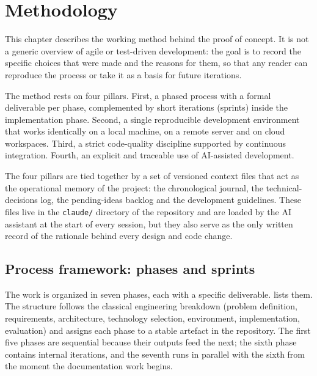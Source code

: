 
\chapter{Methodology}
\label{ch:metodologia}

This chapter describes the working method behind the proof of
concept. It is not a generic overview of agile or test-driven
development: the goal is to record the specific choices that were
made and the reasons for them, so that any reader can reproduce the
process or take it as a basis for future iterations.

The method rests on four pillars. First, a phased process with a
formal deliverable per phase, complemented by short iterations
(sprints) inside the implementation phase. Second, a single
reproducible development environment that works identically on a
local machine, on a remote server and on cloud workspaces. Third, a
strict code-quality discipline supported by continuous integration.
Fourth, an explicit and traceable use of AI-assisted development.

The four pillars are tied together by a set of versioned context
files that act as the operational memory of the project: the
chronological journal, the technical-decisions log, the pending-ideas
backlog and the development guidelines. These files live in the
\texttt{claude/} directory of the repository and are loaded by the
AI assistant at the start of every session, but they also serve as
the only written record of the rationale behind every design and
code change.

\section{Process framework: phases and sprints}
\label{sec:proceso}

The work is organized in seven phases, each with a specific
deliverable.  lists them. The structure follows the
classical engineering breakdown (problem definition, requirements,
architecture, technology selection, environment, implementation,
evaluation) and assigns each phase to a stable artefact in the
repository. The first five phases are sequential because their
outputs feed the next; the sixth phase contains internal iterations,
and the seventh runs in parallel with the sixth from the moment the
documentation work begins.

